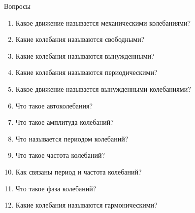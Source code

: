 \documentclass[a5paper, 10pt]{diss_4}
\renewcommand{\'}{\,'}
\begin{document}
\begin{center}
   Вопросы
\end{center}
\begin{enumerate}

\item Какое движение называется механическими колебаниями?
\item Какие колебания называются свободными?
\item Какие колебания называются вынужденными?
\item Какие колебания называются периодическими?
\item Какое движение называется вынужденными колебаниями?
\item Что такое автоколебания?
\item Что такое амплитуда колебаний?
\item Что называется периодом колебаний?
\item Что такое частота колебаний?
\item Как связаны период и частота колебаний?
\item Что такое фаза колебаний?
\item Какие колебания называются гармоническими?

\end{enumerate}
\end{document}
